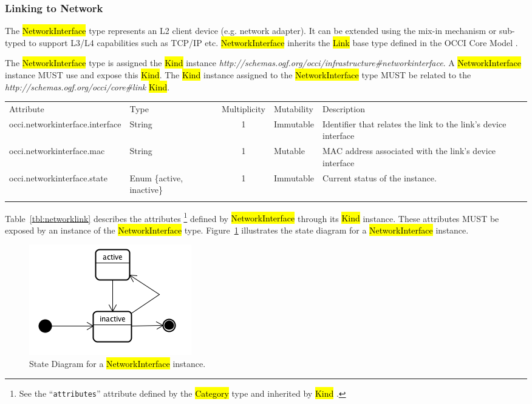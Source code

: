 \documentclass[10pt,a4paper]{article}
\begin{document}
\subsubsection{Linking to Network}
The \hl{NetworkInterface} type  represents an L2 client device (e.g. network
adapter). It can be extended using the mix-in mechanism or sub-typed to support
L3/L4 capabilities such as TCP/IP etc. 
%
\hl{NetworkInterface} inherits the \hl{Link} base type defined in the OCCI Core Model \cite{occi:core}.

The \hl{NetworkInterface} type is assigned the \hl{Kind} instance
\textit{http://schemas.ogf.org/occi/infrastructure\#networkinterface}.
A \hl{NetworkInterface} instance MUST use and expose this \hl{Kind}. 
%
The \hl{Kind} instance assigned to the \hl{NetworkInterface} type MUST be
related to the \textit{http://schemas.ogf.org/occi/core\#link} \hl{Kind}.

{
	\begin{tabular}{lp{1.8cm}clp{5cm}}
	\toprule
	Attribute&Type&Multi\-plicity&Mutability&Description\\
	\colrule
	occi.networkinterface.interface & String & 1 & Immutable 
	& Identifier that relates the link to the link's device interface\\
	occi.networkinterface.mac & String & 1 & Mutable 
	& MAC address associated with the link's device interface\\
	occi.networkinterface.state & Enum \{active, inactive\}& 1 
	& Immutable & Current status of the instance.\\
	\botrule
	\end{tabular}
}
Table~\ref{tbl:networklink} describes the attributes%
\footnote{See the ``{\tt attributes}'' attribute defined by the \hl{Category}
type and inherited by \hl{Kind} \cite{occi:core}.} 
defined by \hl{NetworkInterface} through its \hl{Kind} instance. These attributes
MUST be exposed by an instance of the \hl{NetworkInterface} type. 
Figure~\ref{fig:networklink_state} illustrates the state diagram for a \hl{NetworkInterface} instance.

\begin{figure}[!h]
	\centering
	\includegraphics[scale=0.4]{figs/infra-link-state.png}
	\caption{State Diagram for a \hl{NetworkInterface} instance.}
	\label{fig:networklink_state}
\end{figure}
\end{document}
